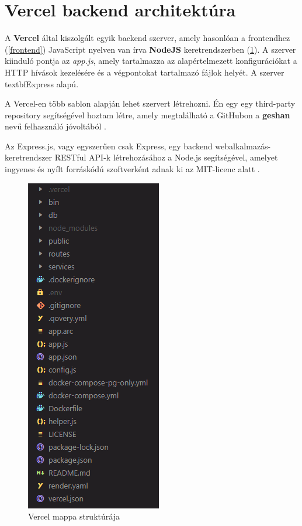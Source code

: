 \section {Vercel backend architektúra}

A \textbf{Vercel} által kiszolgált egyik backend szerver, amely hasonlóan a frontendhez (\ref{frontend}) JavaScript nyelven van írva \textbf{NodeJS} keretrendszerben (\ref{abra:vercelStructure}). A szerver kiinduló pontja az \textit{app.js}, amely tartalmazza az alapértelmezett konfigurációkat a HTTP hívások kezelésére és a végpontokat tartalmazó fájlok helyét. A szerver textbf{Express} alapú.

A Vercel-en több sablon alapján lehet szervert létrehozni. Én egy egy third-party repository segítségével hoztam létre, amely megtalálható a GitHubon a \textbf{geshan} nevű felhasználó jóvoltából \cite{GitNodeSql}.

Az Express.js, vagy egyszerűen csak Express, egy backend webalkalmazás-keretrendszer RESTful API-k létrehozásához a Node.js segítségével, amelyet ingyenes és nyílt forráskódú szoftverként adnak ki az MIT-licenc alatt \cite{WikiExpress}.

\begin{figure}[!h]
	\centering
	\includegraphics[scale=0.6]{images/vercelStructure}
	\caption{Vercel mappa struktúrája}
	\label{abra:vercelStructure}
\end{figure}

